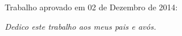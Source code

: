 \documentclass[	12pt, Times, openright, twoside, a4paper, english, brazil]{abntex2}
\begin{document}
%
% 
%
\begin{folhadeaprovacao}
  \begin{center}
    {\ABNTEXchapterfont\large\imprimirautor}

    \vspace*{\fill}\vspace*{\fill}
    {\ABNTEXchapterfont\bfseries\Large\imprimirtitulo}
    \vspace*{\fill}
    
    \hspace{.45\textwidth}
    \begin{minipage}{.5\textwidth}
        \imprimirpreambulo
    \end{minipage}%
    \vspace*{\fill}
   \end{center}
    
   Trabalho aprovado em 02 de Dezembro de 2014:

      
   \begin{center}
    \vspace*{0.5cm}
    {\large\imprimirlocal}
    \par
    {\large\imprimirdata}
    \vspace*{1cm}
  \end{center}
  
\end{folhadeaprovacao}

\begin{dedicatoria}
   \vspace*{\fill}
   \centering
   \noindent
   \textit{Dedico este trabalho aos meus pais e avós.} \vspace*{\fill}
\end{dedicatoria}
\end{document}
